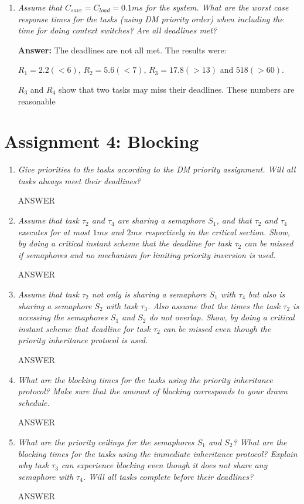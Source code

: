 \documentclass[a4paper,10pt]{article}
\newcommand{\answer}{\textbf{Answer: }}
\begin{document}
\begin{enumerate}
	\item \emph{Assume that $C_{save} = C_{load} = 0.1 ms$ for the system. What are the worst case response times for the tasks (using DM priority order) when including the time for doing context switches? Are all deadlines met?}
	
	\answer The deadlines are not all met. The results were:
	
	$R_1 = 2.2 (< 6)$, $R_2 = 5.6 (< 7)$, $R_3 = 17.8 (> 13)$ and $518 (> 60)$.
	
	$R_3$ and $R_4$ show that two tasks may miss their deadlines. These numbers are reasonable 
	
\end{enumerate}

\section{Assignment 4: Blocking}

\begin{enumerate}
	\item \emph{Give priorities to the tasks according to the DM priority assignment. Will all tasks always meet their deadlines?}
	
	ANSWER
	\item \emph{Assume that task $\tau_2$ and $\tau_4$ are sharing a semaphore $S_1$, and that $\tau_2$ and $\tau_4$ executes for at most $1 ms$ and $2 ms$ respectively in the critical section. Show, by doing a critical instant scheme that the deadline for task $\tau_2$ can be missed if semaphores and no mechanism for limiting priority inversion is used.}
	
	ANSWER
	\item \emph{Assume that task $\tau_2$ not only is sharing a semaphore $S_1$ with $\tau_4$ but also is sharing a semaphore $S_2$ with task $\tau_3$. Also assume that the times the task $\tau_2$ is accessing the semaphores $S_1$ and $S_2$ do not overlap. Show, by doing a critical instant scheme that deadline for task $\tau_2$ can be missed even though the priority inheritance protocol is used.}
	
	ANSWER
	\item \emph{What are the blocking times for the tasks using the priority inheritance protocol? Make sure that the amount of blocking corresponds to your drawn schedule.}
	
	ANSWER
	
	\item \emph{What are the priority ceilings for the semaphores $S_1$ and $S_2$? What are the blocking times for the tasks using the immediate inheritance protocol? Explain why task $\tau_3$ can experience blocking even though it does not share any semaphore with $\tau_4$. Will all tasks complete before their deadlines?}
	
	ANSWER
\end{enumerate}
\end{document}
